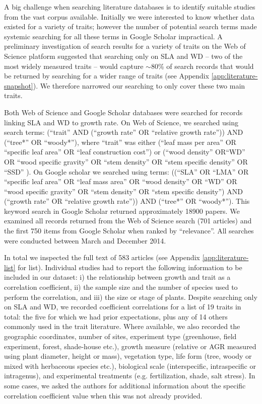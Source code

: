 \documentclass[a4paper,11pt]{article}
\begin{document}
A big challenge when searching literature databases is to identify suitable studies from the vast corpus available. Initially we were interested to know whether data existed for a variety of traits; however the number of potential search terms made systemic searching for all these terms in Google Scholar impractical. A preliminary investigation of search results for a variety of traits on the Web of Science platform suggested that searching only on SLA and WD -- two of the most widely measured traits -- would capture $\sim$80\% of search records that would be returned by searching for a wider range of traits (see Appendix \ref{app:literature-snapshot}). We therefore narrowed our searching to only cover these two main traits.

Both Web of Science and Google Scholar databases were searched for records linking SLA and WD to growth rate. On Web of Science, we searched using  search terms: (``trait'' AND (``growth rate'' OR ``relative growth rate'')) AND (``tree*'' OR ``woody*''), where ``trait'' was either (``leaf mass per area'' OR ``specific leaf area'' OR ``leaf construction cost'') or (``wood density'' OR``WD'' OR ``wood specific gravity'' OR ``stem density'' OR ``stem specific density'' OR ``SSD'' ). On Google scholar we searched using terms: ((``SLA'' OR ``LMA'' OR ``specific leaf area'' OR ``leaf mass area'' OR ``wood density'' OR ``WD'' OR ``wood specific gravity'' OR ``stem density'' OR ``stem specific density'') AND (``growth rate'' OR ``relative growth rate'')) AND (``tree*'' OR ``woody*''). This keyword search in Google Scholar returned approximately 18900 papers. We examined all records returned from the Web of Science search (701 articles) and the first 750 items from Google Scholar when ranked by ``relevance''. All searches were conducted between March and December 2014.

In total we inspected the full text of 583 articles (see Appendix \ref{app:literature-list} for list). Individual studies had to report the following information to be included in our dataset: i) the relationship between growth and trait as a correlation coefficient, ii) the sample size and the number of species used to perform the correlation, and iii) the size or stage of plants. Despite searching only on SLA and WD, we recorded coefficient correlations for a list of 19 traits in total: the five for which we had prior expectations, plus any of 14 others commonly used in the trait literature. Where available, we also recorded the geographic coordinates, number of sites, experiment type (greenhouse, field experiment, forest, shade-house etc.), growth measure (relative or AGR measured using plant diameter, height or mass), vegetation type, life form (tree, woody or mixed with herbaceous species etc.), biological scale (interspecific, intraspecific or intragenus), and experimental treatments (e.g. fertilization, shade, salt stress). In some cases, we asked the authors for additional information about the specific correlation coefficient value when this was not already provided.
\end{document}
